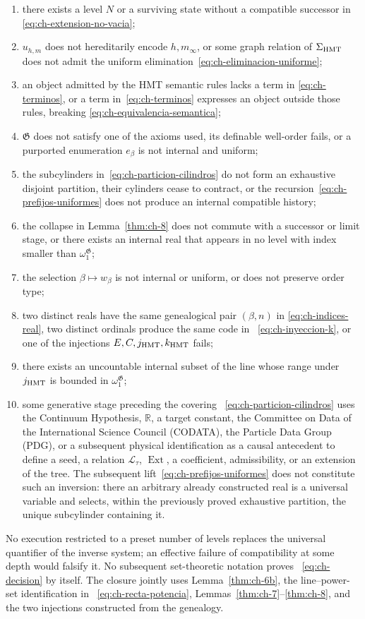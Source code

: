 \begin{enumerate}
\item there exists a level \(N\) or a surviving state without a compatible successor in
\eqref{eq:ch-extension-no-vacia};
\item \(u_{h,m}\) does not hereditarily encode \(h,m_\infty\), or some graph
relation of \(\Sigma_{\rm HMT}\) does not admit the uniform elimination~\eqref{eq:ch-eliminacion-uniforme};
\item an object admitted by the HMT semantic rules lacks a term in
\eqref{eq:ch-terminos}, or a term in~\eqref{eq:ch-terminos} expresses an object outside those rules, breaking
\eqref{eq:ch-equivalencia-semantica};
\item \(\mathfrak G\) does not satisfy one of the axioms used, its definable
well-order fails, or a purported enumeration \(e_\beta\) is not internal and
uniform;
\item the subcylinders in~\eqref{eq:ch-particion-cilindros} do not form an
exhaustive disjoint partition, their cylinders cease to contract, or the
recursion~\eqref{eq:ch-prefijos-uniformes} does not produce an internal
compatible history;
\item the collapse in Lemma~\ref{thm:ch-8} does not commute with a successor or
limit stage, or there exists an internal real that appears in no level with
index smaller than
\(\omega_1^{\mathfrak G}\);
\item the selection \(\beta\mapsto w_\beta\) is not internal or uniform, or
does not preserve order type;
\item two distinct reals have the same genealogical pair \((\beta,n)\) in
\eqref{eq:ch-indices-real}, two distinct ordinals produce the same code in
~\eqref{eq:ch-inyeccion-k}, or one of the injections
\(E,C,j_{\rm HMT},k_{\rm HMT}\) fails;
\item there exists an uncountable internal subset of the line whose range under
\(j_{\rm HMT}\) is bounded in \(\omega_1^{\mathfrak G}\);
\item some generative stage preceding the covering
~\eqref{eq:ch-particion-cilindros} uses the Continuum Hypothesis,
\(\mathbb R\), a target constant, the Committee on Data of the International
Science Council (CODATA), the Particle Data Group (PDG), or a subsequent
physical identification as a causal antecedent to define a seed, a relation
\(\mathscr L_\tau\), \(\operatorname{Ext}\), a coefficient, admissibility, or
an extension of the tree. The subsequent lift~\eqref{eq:ch-prefijos-uniformes}
does not constitute such an inversion: there an arbitrary already constructed
real is a universal variable and selects, within the previously proved
exhaustive partition, the unique subcylinder containing it.
\end{enumerate}

No execution restricted to a preset number of levels replaces the universal
quantifier of the inverse system; an effective failure of compatibility at
some depth would falsify it. No subsequent set-theoretic notation proves
~\eqref{eq:ch-decision} by itself. The closure jointly uses
Lemma~\ref{thm:ch-6b}, the line--power-set identification in
~\eqref{eq:ch-recta-potencia}, Lemmas~\ref{thm:ch-7}--\ref{thm:ch-8}, and the
two injections constructed from the genealogy.
